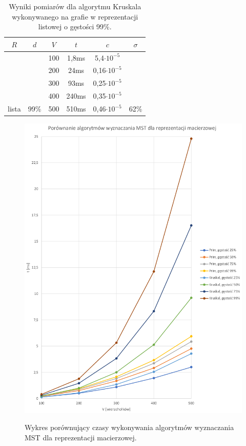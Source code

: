 \documentclass[a4paper,12pt]{article}
\begin{document}
\begin{table}[H]
	\centering
	\caption{\centering Wyniki pomiarów dla algorytmu Kruskala wykonywanego na grafie w reprezentacji listowej o gęstości 99\%.}
	\begin{tabular}{|c|c|c|c|c|c|}
		\hline
		\rowcolor[HTML]{C0C0C0} 
		$R$                     & $d$                    & $V$ & $t$   & $c$                 & $\sigma$               \\ \hline
		&                        & 100 & 1,8ms & 5,4$\cdot 10^{-5}$  &                        \\ \cline{3-5}
		&                        & 200 & 24ms  & 0,16$\cdot 10^{-5}$ &                        \\ \cline{3-5}
		&                        & 300 & 93ms  & 0,25$\cdot 10^{-5}$ &                        \\ \cline{3-5}
		&                        & 400 & 240ms & 0,35$\cdot 10^{-5}$ &                        \\ \cline{3-5}
		\multirow{-5}{*}{lista} & \multirow{-5}{*}{99\%} & 500 & 510ms & 0,46$\cdot 10^{-5}$ & \multirow{-5}{*}{62\%} \\ \hline
	\end{tabular}
\end{table}

\begin{figure}[H]
	\centering
	\caption{\centering Wykres porównujący czasy wykonywania algorytmów wyznaczania MST dla reprezentacji macierzowej.}
	\includegraphics[width=14cm]{fig5.png}
	\label{fig.wykres-macierz-mst}
\end{figure}
\end{document}
